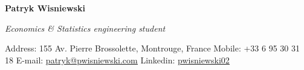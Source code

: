 \documentclass[11pt]{report}
\begin{document}
\hspace*{-\parindent}\hspace{-1em}
\begin{center}
\begin{Large}\textbf{Patryk Wisniewski\\}\end{Large}
\emph{Economics \& Statistics engineering student}
\end{center}\vspace{0.1cm}
	 Address: 155 Av. Pierre Brossolette, Montrouge, France \hfill Mobile: +33 6 95 30 31 18 
	 \newline E-mail: \href{mailto:patryk@pwisniewski.com}{\underline{patryk@pwisniewski.com}} \hfill
	 Linkedin: \href{https://linkedin.com/in/pwisniewski02}{\underline{pwisniewski02}}


\end{document}
